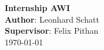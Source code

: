 \begin{titlepage}
    \centering
    \vspace*{3cm}
    {\Huge \textbf{Internship AWI} \\[3ex]}
    \vfill
    {\large \textbf{Author}: Leonhard Schatt\\
    \textbf{Supervisor}: Felix Pithan}\\[1ex]
    {\today}


    \newpage
\end{titlepage}

\newpage

\restoregeometry

